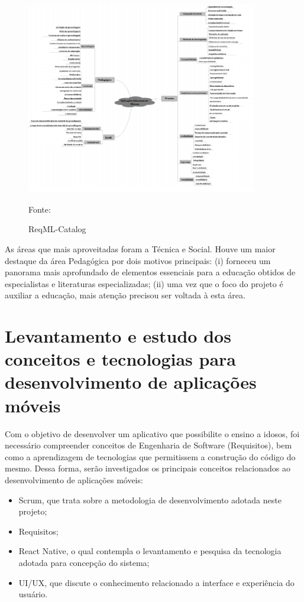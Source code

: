 \begin{figure}[H]
\centering
    \caption{ReqML-Catalog}
    \label{fig:reqML}
    \includegraphics[width=0.9\textwidth]{Figuras/reqML-catalog.png}
    
    Fonte: \cite{soad2017reqml}
\end{figure}

As áreas que mais aproveitadas foram a Técnica e Social. Houve um maior destaque da área Pedagógica por dois motivos principais: (i) forneceu um panorama mais aprofundado de elementos essenciais para a educação obtidos de especialistas e literaturas especializadas; (ii) uma vez que o foco do projeto é auxiliar a educação, mais atenção precisou ser voltada à esta área.

\section{Levantamento e estudo dos conceitos e tecnologias para desenvolvimento de aplicações móveis}

Com o objetivo de desenvolver um aplicativo que possibilite o ensino a idosos, foi necessário compreender conceitos de Engenharia de Software (Requisitos), bem como a aprendizagem de tecnologias que permitissem a construção do código do mesmo. Dessa forma, serão investigados os principais conceitos relacionados ao desenvolvimento de aplicações móveis: 

\begin{itemize}
    \item Scrum, que trata sobre a metodologia de desenvolvimento adotada neste projeto;
    \item Requisitos;
    \item React Native, o qual contempla o levantamento e pesquisa da tecnologia adotada para concepção do sistema;
    \item UI/UX, que discute o conhecimento relacionado a interface e experiência do usuário.
\end{itemize}

